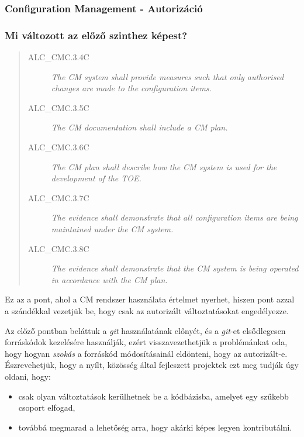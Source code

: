 \pagebreak[1]
\subsubsection{Configuration Management - Autorizáció}
\subsubsection{Mi változott az előző szinthez képest?}
\begin{quote}
    \begin{description}
        \item[ALC\_CMC.3.4C]{\emph{The CM system shall provide measures such that only authorised
            changes are made to the configuration items.}}
        \item[ALC\_CMC.3.5C]{\emph{The CM documentation shall include a CM plan.}}
        \item[ALC\_CMC.3.6C]{\emph{The CM plan shall describe how the CM system is used for the
            development of the TOE.}}
        \item[ALC\_CMC.3.7C]{\emph{The evidence shall demonstrate that all configuration items are
            being maintained under the CM system.}}
        \item[ALC\_CMC.3.8C]{\emph{The evidence shall demonstrate that the CM system is being
            operated in accordance with the CM plan.}}
    \end{description}
\end{quote}

Ez az a pont, ahol a CM rendszer használata értelmet nyerhet, hiszen pont azzal a szándékkal
vezetjük be, hogy csak az autorizált változtatásokat engedélyezze.

Az előző pontban beláttuk a \emph{git} használatának előnyét, és a \emph{git}-et elsődlegesen
forráskódok kezelésére használják, ezért visszavezethetjük a problémánkat oda, hogy hogyan
\emph{szokás} a forráskód módosításainál eldönteni, hogy az autorizált-e.
Észrevehetjük, hogy a nyílt, közösség által fejleszett projektek ezt meg tudják
úgy oldani, hogy:
\begin{itemize}
    \item{csak olyan változtatások kerülhetnek be a kódbázisba, amelyet egy szűkebb csoport elfogad,}
    \item{továbbá megmarad a lehetőség arra, hogy akárki képes legyen kontributálni.}
\end{itemize}

